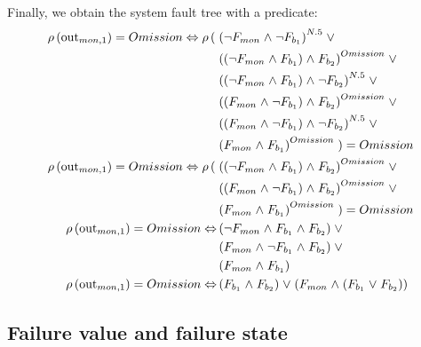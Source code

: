 Finally, we obtain the system fault tree with a predicate:
\begin{align*}
\rho\left(\mathrm{out}_{mon,1}\right) = Omission \Leftrightarrow \rho\left(\right.
  &\left( 
    \neg F_{mon} \mathrel{\wedge} \neg F_{b_1}  
  \right)^{N.5} \mathrel{\vee} \\
  & \left(
    \left(\neg F_{mon} \mathrel{\wedge} F_{b_1}\right) \mathrel{\wedge} F_{b_2} 
  \right)^{Omission } \mathrel{\vee}  \\
  & \left(
    \left(\neg F_{mon} \mathrel{\wedge} F_{b_1}\right) \mathrel{\wedge} \neg F_{b_2}
  \right)^{N.5} \mathrel{\vee} \\ 
  & \left(
    \left(F_{mon} \mathrel{\wedge} \neg F_{b_1}\right) \mathrel{\wedge} F_{b_2}
  \right)^{Omission} \mathrel{\vee} \\
  & \left(
    \left(F_{mon} \mathrel{\wedge} \neg F_{b_1} \right) \mathrel{\wedge} \neg F_{b_2}
  \right)^{N.5} \mathrel{\vee} \\
  & \left(
    F_{mon} \mathrel{\wedge} F_{b_1}
  \right)^{Omission}
\left.\right) = Omission\\
\rho\left(\mathrm{out}_{mon,1}\right) = Omission \Leftrightarrow \rho\left(\right.
  & \left(
    \left(\neg F_{mon} \mathrel{\wedge} F_{b_1}\right) \mathrel{\wedge} F_{b_2} 
  \right)^{Omission } \mathrel{\vee} \\  
  & \left(
    \left(F_{mon} \mathrel{\wedge} \neg F_{b_1}\right) \mathrel{\wedge} F_{b_2}
  \right)^{Omission} \mathrel{\vee} \\
  & \left(
    F_{mon} \mathrel{\wedge} F_{b_1}
  \right)^{Omission}
\left.\right) = Omission \\
\rho\left(\mathrm{out}_{mon,1}\right) = Omission \Leftrightarrow 
  & \left(
    \neg F_{mon} \mathrel{\wedge} F_{b_1} \mathrel{\wedge} F_{b_2} 
  \right) \mathrel{\vee} \\  
  & \left(
    F_{mon} \mathrel{\wedge} \neg F_{b_1}\mathrel{\wedge} F_{b_2}
  \right) \mathrel{\vee} \\
  & \left(
    F_{mon} \mathrel{\wedge} F_{b_1}
  \right) \\
\rho\left(\mathrm{out}_{mon,1}\right) = Omission \Leftrightarrow & 
  \left(F_{b_1} \mathrel{\wedge} F_{b_2}\right) \mathrel{\vee}
  \left(F_{mon} \mathrel{\wedge} \left(F_{b_1} \mathrel{\vee} F_{b_2}\right) \right)
\end{align*}

\subsection{Failure value and failure state}

%
%

